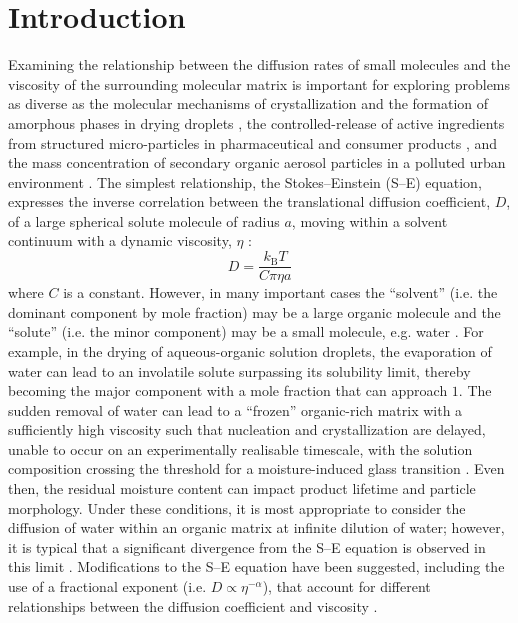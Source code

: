 \section{Introduction}\label{sec:wat_intro}
Examining the relationship between the diffusion rates of small molecules and the viscosity of the surrounding molecular matrix is important for exploring problems as diverse as the molecular mechanisms of crystallization and the formation of amorphous phases in drying droplets \cite{Nascimento2010,Mikhailov2009a,Koop2011}, the controlled-release of active ingredients from structured micro-particles in pharmaceutical and consumer products \cite{hidy1984aerosols,Hancock1997,Lorenz2011,Haddrell2014}, and the mass concentration of secondary organic aerosol particles in a polluted urban environment \cite{Shiraiwa2012a,mai2015under,Maclean2017}. The simplest relationship, the Stokes–Einstein (S–E) equation, expresses the inverse correlation between the translational diffusion coefficient, $D$, of a large spherical solute molecule of radius $a$, moving within a solvent continuum with a dynamic viscosity, $\eta$ \cite{powerTransitionLiquidSolidlike2013,chenStokesEinsteinRelationSupercooled2006}:
\begin{equation}\label{eqn:diffusion}
D=\frac{k_{\mathrm{B}} T}{C \pi \eta a}
\end{equation}
where $C$ is a constant. However, in many important cases the ``solvent” (i.e. the dominant component by mole fraction) may be a large organic molecule and the ``solute” (i.e. the minor component) may be a small molecule, e.g. water \cite{powerTransitionLiquidSolidlike2013,Price2014,Molinero2005}. For example, in the drying of aqueous-organic solution droplets, the evaporation of water can lead to an involatile solute surpassing its solubility limit, thereby becoming the major component with a mole fraction that can approach $1$. The sudden removal of water can lead to a ``frozen'' organic-rich matrix with a sufficiently high viscosity such that nucleation and crystallization are delayed, unable to occur on an experimentally realisable timescale, with the solution composition crossing the threshold for a moisture-induced glass transition \cite{Bones2012}. Even then, the residual moisture content can impact product lifetime and particle morphology. Under these conditions, it is most appropriate to consider the diffusion of water within an organic matrix at infinite dilution of water; however, it is typical that a significant divergence from the S–E equation is observed in this limit \cite{powerTransitionLiquidSolidlike2013,Price2015,Chenyakin2017}. Modifications to the S–E equation have been suggested, including the use of a fractional exponent (i.e. $D \propto \eta^{-\alpha}$), that account for different relationships between the diffusion coefficient and viscosity \cite{Harris2009,price2016sucrose, Fernandez-Alonso2007}.

